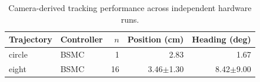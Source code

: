 \begin{table}[!t]
\centering
\caption{Camera-derived tracking performance across independent hardware runs.}
\label{tab:tracking}
\begin{tabular}{llrrr}
\hline
Trajectory & Controller & $n$ & Position (cm) & Heading (deg) \\
\hline
circle & BSMC & 1 & 2.83 & 1.67 \\
eight & BSMC & 16 & 3.46$\pm$1.30 & 8.42$\pm$9.00 \\
\hline
\end{tabular}
\end{table}
